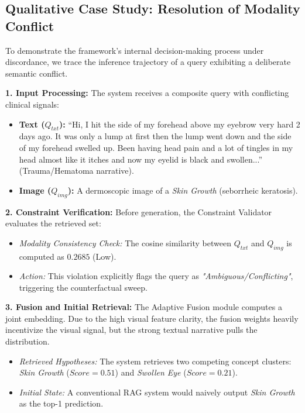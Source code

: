 
\subsection{Qualitative Case Study: Resolution of Modality Conflict}
\label{subsec:case_study}
To demonstrate the framework's internal decision-making process under discordance, we trace the inference trajectory of a query exhibiting a deliberate semantic conflict.

\textbf{1. Input Processing:}
The system receives a composite query with conflicting clinical signals:
\begin{itemize}
    \item \textbf{Text ($Q_{txt}$):} ``Hi, I hit the side of my forehead above my eyebrow very hard 2 days ago. It was only a lump at first then the lump went down and the side of my forehead swelled up. Been having head pain and a lot of tingles in my head almost like it itches and now my eyelid is black and swollen...'' (Trauma/Hematoma narrative).
    \item \textbf{Image ($Q_{img}$):} A dermoscopic image of a \textit{Skin Growth} (seborrheic keratosis).
\end{itemize}

\textbf{2. Constraint Verification:}
Before generation, the Constraint Validator evaluates the retrieved set:
\begin{itemize}
    \item \textit{Modality Consistency Check:} The cosine similarity between $Q_{txt}$ and $Q_{img}$ is computed as $\mathbf{0.2685}$ (Low).
    \item \textit{Action:} This violation explicitly flags the query as \textit{"Ambiguous/Conflicting"}, triggering the counterfactual sweep.
\end{itemize}

\textbf{3. Fusion and Initial Retrieval:}
The Adaptive Fusion module computes a joint embedding. Due to the high visual feature clarity, the fusion weights heavily incentivize the visual signal, but the strong textual narrative pulls the distribution.
\begin{itemize}
    \item \textit{Retrieved Hypotheses:} The system retrieves two competing concept clusters: \textit{Skin Growth} ($Score=0.51$) and \textit{Swollen Eye} ($Score=0.21$).
    \item \textit{Initial State:} A conventional RAG system would naively output \textit{Skin Growth} as the top-1 prediction.
\end{itemize}

